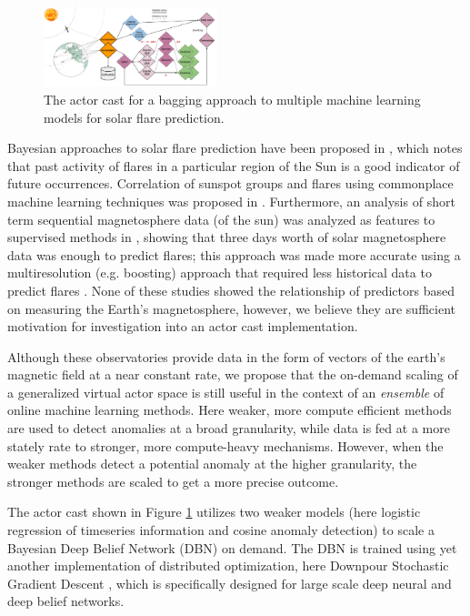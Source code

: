 \documentclass[conference,twocolumn,10pt]{IEEEtran}
\begin{document}
\begin{figure}[!t]
    \centering
    \includegraphics[width=0.45\textwidth]{solar_cast}
    \caption{The actor cast for a bagging approach to multiple machine learning models for solar flare prediction.}
    \label{fig:solar_cast}
\end{figure}

Bayesian approaches to solar flare prediction have been proposed in \cite{wheatland_bayesian_2004}, which notes that past activity of flares in a particular region of the Sun is a good indicator of future occurrences. Correlation of sunspot groups and flares using commonplace machine learning techniques was proposed in \cite{qahwaji_automatic_2007}. Furthermore, an analysis of short term sequential magnetosphere data (of the sun) was analyzed as features to supervised methods in \cite{yu_short-term_2009}, showing that three days worth of solar magnetosphere data was enough to predict flares; this approach was made more accurate using a multiresolution (e.g. boosting) approach that required less historical data to predict flares \cite{yu_short-term_2010}. None of these studies showed the relationship of predictors based on measuring the Earth's magnetosphere, however, we believe they are sufficient motivation for investigation into an actor cast implementation.

Although these observatories provide data in the form of vectors of the earth's magnetic field at a near constant rate, we propose that the on-demand scaling of a generalized virtual actor space is still useful in the context of an \textit{ensemble} of online machine learning methods. Here weaker, more compute efficient methods are used to detect anomalies at a broad granularity, while data is fed at a more stately rate to stronger, more compute-heavy mechanisms. However, when the weaker methods detect a potential anomaly at the higher granularity, the stronger methods are scaled to get a more precise outcome.

The actor cast shown in Figure \ref{fig:solar_cast} utilizes two weaker models (here logistic regression of timeseries information and cosine anomaly detection) to scale a Bayesian Deep Belief Network (DBN) on demand. The DBN is trained using yet another implementation of distributed optimization, here Downpour Stochastic Gradient Descent \cite{dean_large_2012}, which is specifically designed for large scale deep neural and deep belief networks.
\end{document}
